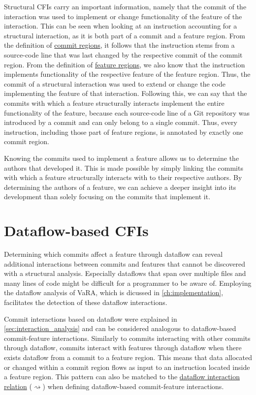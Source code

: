 Structural CFIs carry an important information, namely that the commit of the interaction was used to implement or change functionality of the feature of the interaction.
This can be seen when looking at an instruction accounting for a structural interaction, as it is both part of a commit and a feature region.
From the definition of \hyperref[def:commit_regions]{commit regions}, it follows that the instruction stems from a source-code line that was last changed by the respective commit of the commit region. 
From the definition of \hyperref[def:feature_regions]{feature regions}, we also know that the instruction implements functionality of the respective feature of the feature region. 
Thus, the commit of a structural interaction was used to extend or change the code implementing the feature of that interaction.
Following this, we can say that the commits with which a feature structurally interacts implement the entire functionality of the feature, because each source-code line of a Git repository was introduced by a commit and can only belong to a single commit.
Thus, every instruction, including those part of feature regions, is annotated by exactly one commit region. 

Knowing the commits used to implement a feature allows us to determine the authors that developed it.
This is made possible by simply linking the commits with which a feature structurally interacts with to their respective authors.
By determining the authors of a feature, we can achieve a deeper insight into its development than solely focusing on the commits that implement it. 

\section{Dataflow-based CFIs}\label{sec:dataflow_cfis}

Determining which commits affect a feature through dataflow can reveal additional interactions between commits and features that cannot be discovered with a structural analysis.
Especially dataflows that span over multiple files and many lines of code might be difficult for a programmer to be aware of.
Employing the dataflow analysis of VaRA, which is dicussed in \autoref{ch:implementation}, facilitates the detection of these dataflow interactions. 

Commit interactions based on dataflow were explained in \autoref{sec:interaction_analysis} and can be considered analogous to dataflow-based commit-feature interactions.
Similarly to commits interacting with other commits through dataflow, commits interact with features through dataflow when there exists dataflow from a commit to a feature region.
This means that data allocated or changed within a commit region flows as input to an instruction located inside a feature region.
This pattern can also be matched to the \hyperref[def:dataflow_relation]{dataflow interaction relation} ($\rightsquigarrow$) when defining dataflow-based commit-feature interactions.


